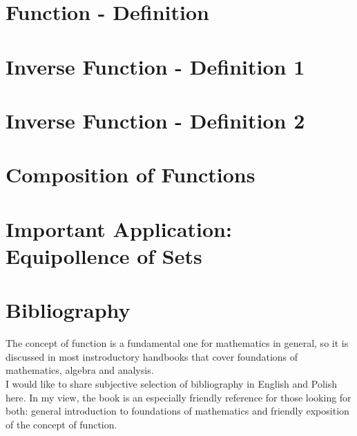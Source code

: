 \documentclass[12pt]{article}
\theoremstyle{plain}
\theoremstyle{definition}
\begin{document}
\section{Function - Definition}
\section{Inverse Function - Definition 1}
\section{Inverse Function - Definition 2}
\section{Composition of Functions}
\section{Important Application: Equipollence of Sets}

\section{Bibliography}
The concept of function is a fundamental one for mathematics in general,
 so it is discussed in most instroductory 
handbooks that cover foundations of mathematics, algebra and analysis. 
\\ \indent I would like to share subjective selection of bibliography in English 
and Polish here. In my view, the book \cite{sets_logic_computation} is an especially 
friendly reference for  those looking for both: general introduction to foundations of 
 mathematics and friendly exposition of the concept of function.



\end{document}
